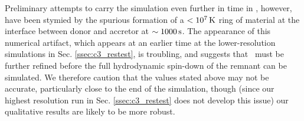 Preliminary attempts to carry the simulation even further in time in \arepo, however, have been stymied by the spurious formation of a $<10^7\,\mathrm{K}$ ring of material at the interface between donor and accretor at $\sim1000\,\mathrm{s}$.  The appearance of this numerical artifact, which appears at an earlier time at the lower-resolution simulations in Sec. \ref{ssec:c3_restest}, is troubling, and suggests that \arepo\ must be further refined before the full hydrodynamic spin-down of the remnant can be simulated.  We therefore caution that the values stated above may not be accurate, particularly close to the end of the simulation, though (since our highest resolution run in Sec. \ref{ssec:c3_restest} does not develop this issue) our qualitative results are likely to be more robust.




